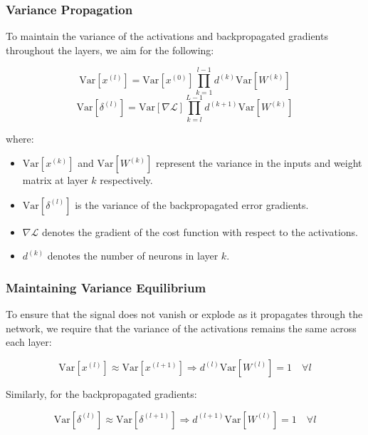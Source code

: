 \subsubsection*{Variance Propagation}
To maintain the variance of the activations and backpropagated gradients throughout the layers, we aim for the following:

\begin{equation}
    \text{Var}[x^{(l)}] = \text{Var}[x^{(0)}] \prod_{k=1}^{l-1} d^{(k)} \text{Var}[W^{(k)}]
\end{equation}
\begin{equation}
    \text{Var}[\delta^{(l)}] = \text{Var}[\nabla \mathcal{L}] \prod_{k=l}^{L-1} d^{(k+1)} \text{Var}[W^{(k)}]
\end{equation}

where:
\begin{itemize}
    \item \(\text{Var}[x^{(k)}]\) and \(\text{Var}[W^{(k)}]\) represent the variance in the inputs and weight matrix at layer \(k\) respectively.
    \item \(\text{Var}[\delta^{(l)}]\) is the variance of the backpropagated error gradients.
    \item \(\nabla \mathcal{L}\) denotes the gradient of the cost function with respect to the activations.
    \item \(d^{(k)}\) denotes the number of neurons in layer \(k\).
\end{itemize}

\subsubsection*{Maintaining Variance Equilibrium}
To ensure that the signal does not vanish or explode as it propagates through the network, we require that the variance of the activations remains the same across each layer:

\begin{equation}
    \text{Var}[x^{(l)}] \approx \text{Var}[x^{(l+1)}] \Rightarrow d^{(l)} \text{Var}[W^{(l)}] = 1 \quad \forall l
\end{equation}

Similarly, for the backpropagated gradients:

\begin{equation}
    \text{Var}[\delta^{(l)}] \approx \text{Var}[\delta^{(l+1)}] \Rightarrow d^{(l+1)} \text{Var}[W^{(l)}] = 1 \quad \forall l
\end{equation}

